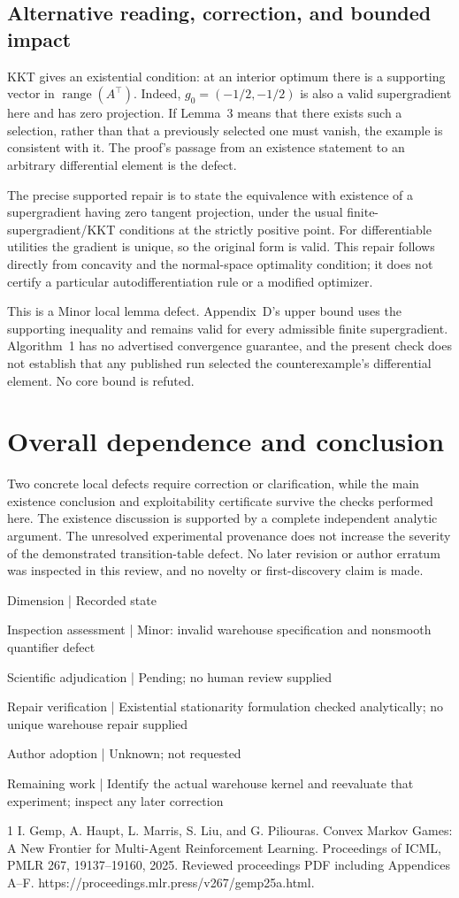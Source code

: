 \documentclass[10pt]{article}
\begin{document}
\subsection*{Alternative reading, correction, and bounded impact}
KKT gives an existential condition: at an interior optimum there is a supporting vector in \(\operatorname{range}(A^\top)\). Indeed, \(g_0=(-1/2,-1/2)\) is also a valid supergradient here and has zero projection. If Lemma 3 means that there exists such a selection, rather than that a previously selected one must vanish, the example is consistent with it. The proof’s passage from an existence statement to an arbitrary differential element is the defect.\par
The precise supported repair is to state the equivalence with existence of a supergradient having zero tangent projection, under the usual finite-supergradient/KKT conditions at the strictly positive point. For differentiable utilities the gradient is unique, so the original form is valid. This repair follows directly from concavity and the normal-space optimality condition; it does not certify a particular autodifferentiation rule or a modified optimizer.\par
This is a Minor local lemma defect. Appendix D’s upper bound uses the supporting inequality and remains valid for every admissible finite supergradient. Algorithm 1 has no advertised convergence guarantee, and the present check does not establish that any published run selected the counterexample’s differential element. No core bound is refuted.\par
\section*{Overall dependence and conclusion}
Two concrete local defects require correction or clarification, while the main existence conclusion and exploitability certificate survive the checks performed here. The existence discussion is supported by a complete independent analytic argument. The unresolved experimental provenance does not increase the severity of the demonstrated transition-table defect. No later revision or author erratum was inspected in this review, and no novelty or first-discovery claim is made.\par
Dimension | Recorded state\par
Inspection assessment | Minor: invalid warehouse specification and nonsmooth quantifier defect\par
Scientific adjudication | Pending; no human review supplied\par
Repair verification | Existential stationarity formulation checked analytically; no unique warehouse repair supplied\par
Author adoption | Unknown; not requested\par
Remaining work | Identify the actual warehouse kernel and reevaluate that experiment; inspect any later correction\par
1 I. Gemp, A. Haupt, L. Marris, S. Liu, and G. Piliouras. Convex Markov Games: A New Frontier for Multi-Agent Reinforcement Learning. Proceedings of ICML, PMLR 267, 19137–19160, 2025. Reviewed proceedings PDF including Appendices A–F. https://proceedings.mlr.press/v267/gemp25a.html.\par
\end{document}
